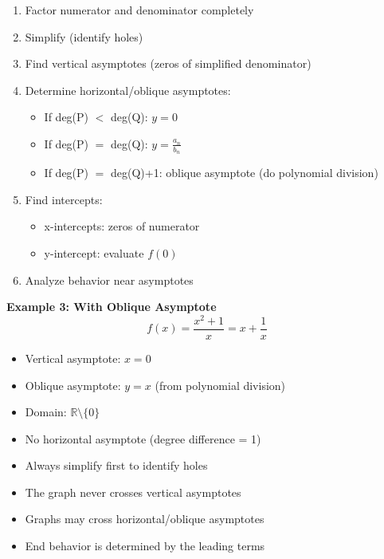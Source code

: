 \documentclass{article} %
\begin{document}
\begin{enumerate}
    \item Factor numerator and denominator completely
    \item Simplify (identify holes)
    \item Find vertical asymptotes (zeros of simplified denominator)
    \item Determine horizontal/oblique asymptotes:
    \begin{itemize}
        \item If deg(P) $<$ deg(Q): $y=0$
        \item If deg(P) $=$ deg(Q): $y=\frac{a_n}{b_n}$
        \item If deg(P) $=$ deg(Q)+1: oblique asymptote (do polynomial division)
    \end{itemize}
    \item Find intercepts:
    \begin{itemize}
        \item x-intercepts: zeros of numerator
        \item y-intercept: evaluate $f(0)$
    \end{itemize}
    \item Analyze behavior near asymptotes
\end{enumerate}

\textbf{Example 3: With Oblique Asymptote}
\[
f(x) = \frac{x^2+1}{x} = x + \frac{1}{x}
\]

\begin{itemize}
    \item Vertical asymptote: $x=0$
    \item Oblique asymptote: $y=x$ (from polynomial division)
    \item Domain: $\mathbb{R} \setminus \{0\}$
    \item No horizontal asymptote (degree difference = 1)
\end{itemize}

\begin{itemize}
    \item Always simplify first to identify holes
    \item The graph never crosses vertical asymptotes
    \item Graphs may cross horizontal/oblique asymptotes
    \item End behavior is determined by the leading terms
\end{itemize}
\end{document}
